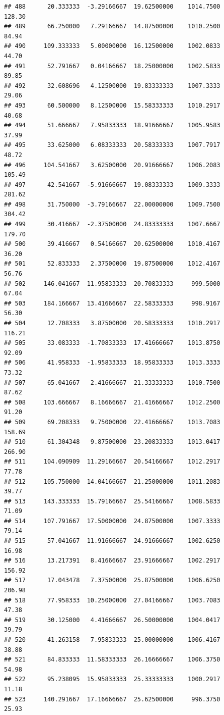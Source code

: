 \documentclass[
]{article}
\begin{document}
\begin{verbatim}
## 488      20.333333  -3.29166667  19.62500000    1014.7500      128.30
## 489      66.250000   7.29166667  14.87500000    1010.2500       84.94
## 490     109.333333   5.00000000  16.12500000    1002.0833       44.70
## 491      52.791667   0.04166667  18.25000000    1002.5833       89.85
## 492      32.608696   4.12500000  19.83333333    1007.3333       29.06
## 493      60.500000   8.12500000  15.58333333    1010.2917       40.68
## 494      51.666667   7.95833333  18.91666667    1005.9583       37.99
## 495      33.625000   6.08333333  20.58333333    1007.7917       48.72
## 496     104.541667   3.62500000  20.91666667    1006.2083      105.49
## 497      42.541667  -5.91666667  19.08333333    1009.3333      281.62
## 498      31.750000  -3.79166667  22.00000000    1009.7500      304.42
## 499      30.416667  -2.37500000  24.83333333    1007.6667      179.70
## 500      39.416667   0.54166667  20.62500000    1010.4167       36.20
## 501      52.833333   2.37500000  19.87500000    1012.4167       56.76
## 502     146.041667  11.95833333  20.70833333     999.5000       67.04
## 503     184.166667  13.41666667  22.58333333     998.9167       56.30
## 504      12.708333   3.87500000  20.58333333    1010.2917      116.21
## 505      33.083333  -1.70833333  17.41666667    1013.8750       92.09
## 506      41.958333  -1.95833333  18.95833333    1013.3333       73.32
## 507      65.041667   2.41666667  21.33333333    1010.7500       87.62
## 508     103.666667   8.16666667  21.41666667    1012.2500       91.20
## 509      69.208333   9.75000000  22.41666667    1013.7083      158.69
## 510      61.304348   9.87500000  23.20833333    1013.0417      266.90
## 511     104.090909  11.29166667  20.54166667    1012.2917       77.78
## 512     105.750000  14.04166667  21.25000000    1011.2083       39.77
## 513     143.333333  15.79166667  25.54166667    1008.5833       71.09
## 514     107.791667  17.50000000  24.87500000    1007.3333       79.14
## 515      57.041667  11.91666667  24.91666667    1002.6250       16.98
## 516      13.217391   8.41666667  23.91666667    1002.2917      156.92
## 517      17.043478   7.37500000  25.87500000    1006.6250      206.98
## 518      77.958333  10.25000000  27.04166667    1003.7083       47.38
## 519      30.125000   4.41666667  26.50000000    1004.0417       39.79
## 520      41.263158   7.95833333  25.00000000    1006.4167       38.88
## 521      84.833333  11.58333333  26.16666667    1006.3750       54.98
## 522      95.238095  15.95833333  25.33333333    1000.2917       11.18
## 523     140.291667  17.16666667  25.62500000     996.3750       25.93

\end{verbatim}
\end{document}
